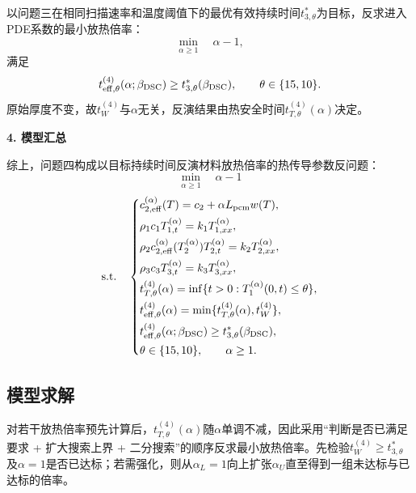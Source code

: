 以问题三在相同扫描速率和温度阈值下的最优有效持续时间$t_{3,\theta}^*$为目标，反求进入PDE系数的最小放热倍率：
\begin{equation}
\min_{\alpha\ge1}\quad \alpha-1,
\label{eq:q4-obj}
\end{equation}
满足
\begin{equation}
t_{\rm eff,\theta}^{(4)}(\alpha;\beta_{\rm DSC})
\ge t_{3,\theta}^*(\beta_{\rm DSC}),
\qquad \theta\in\{15,10\}.
\label{eq:q4-time-constraint}
\end{equation}
原始厚度不变，故$t_W^{(4)}$与$\alpha$无关，反演结果由热安全时间$t_{T,\theta}^{(4)}(\alpha)$决定。

\noindent\textbf{4. 模型汇总}\par
综上，问题四构成以目标持续时间反演材料放热倍率的热传导参数反问题：
\vspace{-0.3\baselineskip}
\begin{equation}
\min_{\alpha\ge1}\quad \alpha-1
\label{eq:q4-summary-obj}
\end{equation}
\begin{equation}
\mathrm{s.t.}\quad
\left\{
\begin{aligned}
&c_{2,\rm eff}^{(\alpha)}(T)=c_2+\alpha L_{\rm pcm}w(T),\\
&\rho_1c_1T_{1,t}^{(\alpha)}=k_1T_{1,xx}^{(\alpha)},\\
&\rho_2c_{2,\rm eff}^{(\alpha)}(T_2^{(\alpha)})T_{2,t}^{(\alpha)}=k_2T_{2,xx}^{(\alpha)},\\
&\rho_3c_3T_{3,t}^{(\alpha)}=k_3T_{3,xx}^{(\alpha)},\\
&t_{T,\theta}^{(4)}(\alpha)=\inf\{t>0:T_1^{(\alpha)}(0,t)\le\theta\},\\
&t_{\rm eff,\theta}^{(4)}(\alpha)=\min\{t_{T,\theta}^{(4)}(\alpha),t_W^{(4)}\},\\
&t_{\rm eff,\theta}^{(4)}(\alpha;\beta_{\rm DSC})\ge t_{3,\theta}^*(\beta_{\rm DSC}),\\
&\theta\in\{15,10\},\qquad \alpha\ge1.
\end{aligned}
\right.
\label{eq:q4-summary-con}
\end{equation}

\subsection{模型求解}

对若干放热倍率预先计算后，$t_{T,\theta}^{(4)}(\alpha)$随$\alpha$单调不减，因此采用“判断是否已满足要求 + 扩大搜索上界 + 二分搜索”的顺序反求最小放热倍率。先检验$t_W^{(4)}\ge t_{3,\theta}^*$及$\alpha=1$是否已达标；若需强化，则从$\alpha_L=1$向上扩张$\alpha_U$直至得到一组未达标与已达标的倍率。

